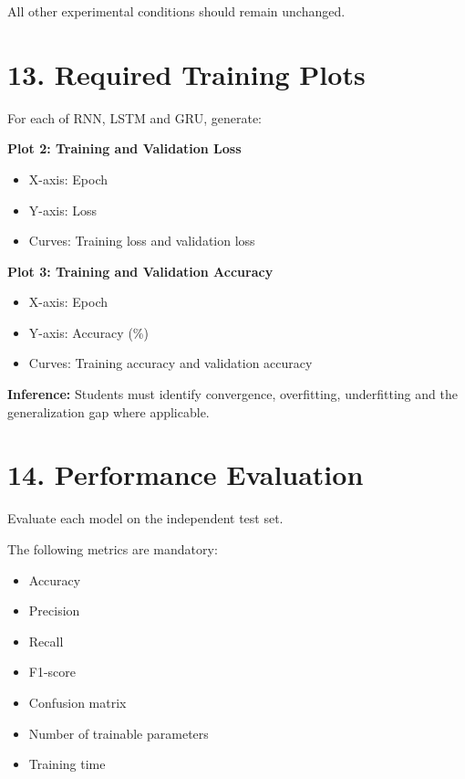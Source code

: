 \documentclass[10pt]{article}
\begin{document}
All other experimental conditions should remain unchanged.

\section*{13. Required Training Plots}

For each of RNN, LSTM and GRU, generate:

\textbf{Plot 2: Training and Validation Loss}

\begin{itemize}
\item X-axis: Epoch
\item Y-axis: Loss
\item Curves: Training loss and validation loss
\end{itemize}

\textbf{Plot 3: Training and Validation Accuracy}

\begin{itemize}
\item X-axis: Epoch
\item Y-axis: Accuracy (\%)
\item Curves: Training accuracy and validation accuracy
\end{itemize}

\textbf{Inference:} Students must identify convergence, overfitting,
underfitting and the generalization gap where applicable.

\section*{14. Performance Evaluation}

Evaluate each model on the independent test set.

The following metrics are mandatory:

\begin{itemize}
\item Accuracy
\item Precision
\item Recall
\item F1-score
\item Confusion matrix
\item Number of trainable parameters
\item Training time
\end{itemize}
\end{document}
